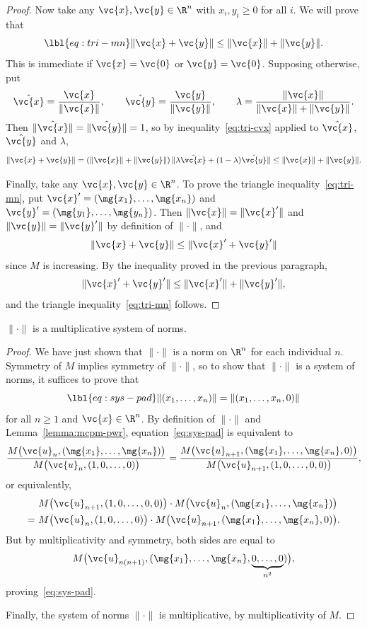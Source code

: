 \begin{proof}
Now take any $\vc{x}, \vc{y} \in \R^n$ with $x_i, y_i \geq 0$ for all $i$.
We will prove that 
% 
\begin{equation}
\lbl{eq:tri-mn}
\|\vc{x} + \vc{y}\| \leq \|\vc{x}\| + \|\vc{y}\|.
\end{equation}
% 
This is immediate if $\vc{x} = \vc{0}$ or $\vc{y} = \vc{0}$.  Supposing
otherwise, put
\[
\hat{\vc{x}} = \frac{\vc{x}}{\|\vc{x}\|},
\qquad
\hat{\vc{y}} = \frac{\vc{y}}{\|\vc{y}\|},
\qquad
\lambda = \frac{\|\vc{x}\|}{\|\vc{x}\| + \|\vc{y}\|}.
\]
Then $\|\hat{\vc{x}}\| = \|\hat{\vc{y}}\| = 1$, so by 
inequality~\eqref{eq:tri-cvx} applied to $\hat{\vc{x}}$, $\hat{\vc{y}}$ and
$\lambda$, 
\[
\|\vc{x} + \vc{y}\|     
=
( \|\vc{x}\| + \|\vc{y}\| ) \,
\| \lambda \hat{\vc{x}} + (1 - \lambda) \hat{\vc{y}} \|     
\leq
\|\vc{x}\| + \|\vc{y}\|.
\]

Finally, take any $\vc{x}, \vc{y} \in \R^n$.  To prove the triangle
inequality~\eqref{eq:tri-mn}, put $\vc{x}' = (\mg{x_1}, \ldots, \mg{x_n})$
and $\vc{y}' = (\mg{y_1}, \ldots, \mg{y_n})$.  Then $\|\vc{x}\| =
\|\vc{x}'\|$ and $\|\vc{y}\| = \|\vc{y}'\|$ by definition of $\|\cdot\|$,
and
\[
\|\vc{x} + \vc{y}\| \leq \|\vc{x}' + \vc{y}'\|
\]
since $M$ is increasing.  By the inequality proved in the previous
paragraph, 
\[
\|\vc{x}' + \vc{y}'\| \leq \|\vc{x}'\| + \|\vc{y}'\|,
\]
and the triangle inequality~\eqref{eq:tri-mn} follows.
\end{proof}

\begin{lemma}
$\|\cdot\|$ is a multiplicative system of norms.  
\end{lemma}

\begin{proof}
We have just shown that $\|\cdot\|$ is a norm on $\R^n$ for each individual
$n$.  Symmetry of $M$ implies symmetry of $\|\cdot\|$, so to show that
$\|\cdot\|$ is a system of norms, it suffices to prove that
% 
\begin{equation}
\lbl{eq:sys-pad}
\| (x_1, \ldots, x_n) \|
=
\| (x_1, \ldots, x_n, 0) \|
\end{equation}
% 
for all $n \geq 1$ and $\vc{x} \in \R^n$.  By definition of $\|\cdot\|$ and
Lemma~\ref{lemma:mcpm-pwr}, equation~\eqref{eq:sys-pad} is equivalent to
\[
\frac{M\bigl( \vc{u}_n, (\mg{x_1}, \ldots, \mg{x_n}) \bigr)}%
{M\bigl(\vc{u}_n, (1, 0, \ldots, 0) \bigr)}
=
\frac{M\bigl( \vc{u}_{n + 1}, (\mg{x_1}, \ldots, \mg{x_n}, 0) \bigr)}%
{M\bigl(\vc{u}_{n + 1}, (1, 0, \ldots, 0, 0) \bigr)},
\]
or equivalently,
% 
\begin{align*}
&
M\bigl( \vc{u}_{n + 1}, (1, 0, \ldots, 0, 0) \bigr)
\cdot
M\bigl( \vc{u}_n, (\mg{x_1}, \ldots, \mg{x_n}) \bigr) \\
=\ 
&
M\bigl( \vc{u}_n, (1, 0, \ldots, 0) \bigr)
\cdot
M\bigl( \vc{u}_{n + 1}, (\mg{x_1}, \ldots, \mg{x_n}, 0) \bigr).
\end{align*}
% 
But by multiplicativity and symmetry, both sides are equal to
\[
M\bigl(
\vc{u}_{n(n + 1)},
(\mg{x_1}, \ldots, \mg{x_n}, \underbrace{0, \ldots, 0}_{n^2})
\bigr),
\]
proving~\eqref{eq:sys-pad}.

Finally, the system of norms $\|\cdot\|$ is multiplicative, by
multiplicativity of $M$.
\end{proof}

